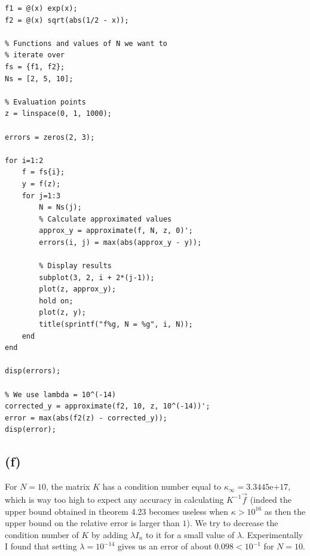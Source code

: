 \documentclass{article}
\begin{document}
\begin{Verbatim}[frame=single,
	label=\textsc{Matlab} code - main.m]
% We define the functions we use
f1 = @(x) exp(x);
f2 = @(x) sqrt(abs(1/2 - x));

% Functions and values of N we want to
% iterate over
fs = {f1, f2};
Ns = [2, 5, 10];

% Evaluation points
z = linspace(0, 1, 1000);

errors = zeros(2, 3);

for i=1:2
    f = fs{i};
    y = f(z);
    for j=1:3
        N = Ns(j);
        % Calculate approximated values
        approx_y = approximate(f, N, z, 0)';
        errors(i, j) = max(abs(approx_y - y));

        % Display results
        subplot(3, 2, i + 2*(j-1));
        plot(z, approx_y);
        hold on;
        plot(z, y);
        title(sprintf("f%g, N = %g", i, N));
    end
end

disp(errors);

% We use lambda = 10^(-14)
corrected_y = approximate(f2, 10, z, 10^(-14))';
error = max(abs(f2(z) - corrected_y));
disp(error);
\end{Verbatim}

\subsection*{(f)}

For $N=10$, the matrix $K$ has a condition number equal to
$\kappa_\infty = 3.3445\mathrm{e}{+17}$, which is way too high to expect any
accuracy in calculating $K^{-1}\vec{f}$ (indeed the upper bound
obtained in theorem 4.23 becomes useless when
$\kappa > 10^{16}$ as then the upper bound on the relative error
is larger than $1$). We try to decrease the
condition number of $K$ by adding $\lambda I_n$ to it for a small
value of $\lambda$. Experimentally I found that setting
$\lambda = 10^{-14}$ gives us an error of about
$0.098 < 10^{-1}$ for $N=10$. 
\end{document}
